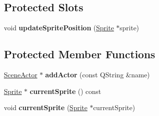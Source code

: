 \subsection*{Protected Slots}
\begin{DoxyCompactItemize}
\item 
\mbox{\label{class_main_window_a34e60652ff3e3db88a02ed27dd1b65f6}} 
void {\bfseries update\+Sprite\+Position} (\hyperlink{class_sprite}{Sprite} $\ast$sprite)
\end{DoxyCompactItemize}
\subsection*{Protected Member Functions}
\begin{DoxyCompactItemize}
\item 
\mbox{\label{class_main_window_abad7b29bc1e42b37a722bf063aab3512}} 
\hyperlink{class_actor}{Scene\+Actor} $\ast$ {\bfseries add\+Actor} (const Q\+String \&name)
\item 
\mbox{\label{class_main_window_a15a2912e758dcab1067e058c05f0985c}} 
\hyperlink{class_sprite}{Sprite} $\ast$ {\bfseries current\+Sprite} () const
\item 
\mbox{\label{class_main_window_aa8933698bfe5ca463cb69879663b573a}} 
void {\bfseries current\+Sprite} (\hyperlink{class_sprite}{Sprite} $\ast$current\+Sprite)
\end{DoxyCompactItemize}
